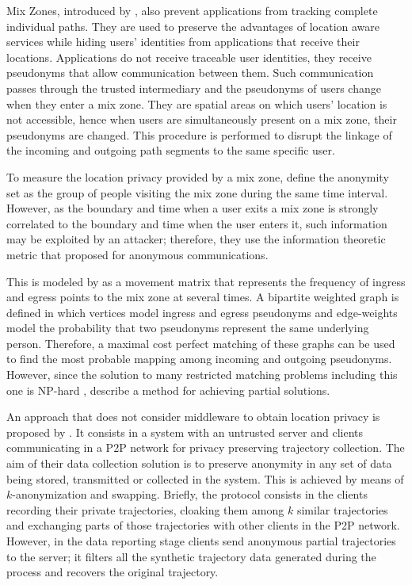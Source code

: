 \documentclass[times,twocolumn,final,authoryear]{elsarticle}
\begin{document}
Mix Zones, introduced by \cite{Beresford2003}, also prevent applications from tracking complete individual paths. 
They are used to preserve the advantages of location aware services while hiding users' identities from applications that receive their locations.
Applications do not receive traceable user identities, they receive pseudonyms that allow communication between them. Such communication passes through the trusted intermediary and the pseudonyms of users change when they enter a mix zone.
They are spatial areas on which users' location is not accessible, hence when users are simultaneously present on a mix zone, their pseudonyms are changed. This procedure is performed to disrupt the linkage of the incoming and outgoing path segments to the same specific user.

To measure the location privacy provided by a mix zone, \cite{Beresford04mixzones} define the anonymity set as the group of people visiting the mix zone during the same time interval. However, as the boundary and time when a user exits a mix zone is strongly correlated to the boundary and time when the user enters it, such information may be exploited by an attacker; therefore, they use the information theoretic metric that \cite{Serjantov2002} proposed for anonymous communications. 

This is modeled by \cite{Beresford04mixzones} as a movement matrix that represents the frequency of ingress and egress points to the mix zone at several times.
A bipartite weighted graph is defined in which vertices model ingress and egress pseudonyms and edge-weights
model the probability that two pseudonyms represent the same underlying person. Therefore, a maximal cost perfect matching of these graphs can be used to find the most probable mapping among incoming and outgoing pseudonyms.  
However, since the solution to many restricted matching problems including this one is NP-hard \citep{Tanimoto1978}, \cite{Beresford04mixzones} describe a method for achieving partial solutions.


An approach that does not consider middleware to obtain location privacy is proposed by \citet[Chapter 9]{Gidofalvi2007}. It consists in a system with an untrusted server and clients communicating in a P2P network for privacy preserving trajectory collection.
The aim of their data collection solution is to preserve anonymity in any set of data being stored, transmitted or
collected in the system. This is achieved by means of $k$-anonymization and swapping.
Briefly, the protocol consists in the clients recording their private trajectories, cloaking them among $k$ similar trajectories and exchanging parts of those trajectories with other clients in the P2P network. However, in the data reporting stage clients send anonymous partial trajectories to the server; it filters all the synthetic trajectory data generated during the process and recovers the original trajectory.
\end{document}
